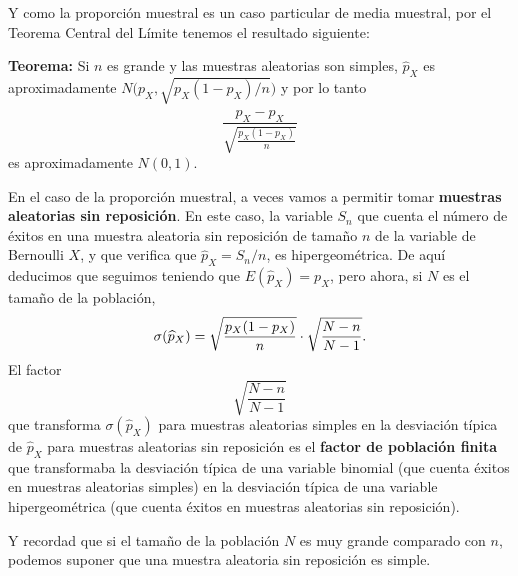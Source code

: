 \documentclass[
  spanish,
  letterpaper,
  DIV=11,
  numbers=noendperiod]{scrreprt}
\begin{document}
Y como la proporción muestral es un caso particular de media muestral,
por el Teorema Central del Límite tenemos el resultado siguiente:

\textbf{Teorema:} Si \(n\) es grande y las muestras aleatorias son
simples, \(\widehat{p}_X\) es aproximadamente
\(N\big (p_X,\sqrt{{p_X(1-p_X)}/{n}}\big)\) y por lo tanto \[
\frac{\widehat{p}_X-p_X}{\sqrt{\frac{{p}_X(1-{p}_X)}{n}}}
\] es aproximadamente \(N(0,1)\).

\begin{tcolorbox}[enhanced jigsaw, arc=.35mm, bottomrule=.15mm, bottomtitle=1mm, breakable, colback=white, colbacktitle=quarto-callout-important-color!10!white, colframe=quarto-callout-important-color-frame, coltitle=black, left=2mm, leftrule=.75mm, opacityback=0, opacitybacktitle=0.6, rightrule=.15mm, title=\textcolor{quarto-callout-important-color}{\faExclamation}\hspace{0.5em}{Importante}, titlerule=0mm, toprule=.15mm, toptitle=1mm]

En el caso de la proporción muestral, a veces vamos a permitir tomar
\textbf{muestras aleatorias sin reposición}. En este caso, la variable
\(S_n\) que cuenta el número de éxitos en una muestra aleatoria sin
reposición de tamaño \(n\) de la variable de Bernoulli \(X\), y que
verifica que \(\widehat{p}_X=S_n/n\), es hipergeométrica. De aquí
deducimos que seguimos teniendo que \(E(\widehat{p}_X)=p_X\), pero
ahora, si \(N\) es el tamaño de la población, \[
\sigma({\widehat{p}_X})=\sqrt{\frac{p_X(1-p_X)}{n}}\cdot
\sqrt{\frac{\vphantom{(p_X}N-n}{N-1}}.
\] El factor \[
\sqrt{\frac{N-n}{N-1}}
\] que transforma \(\sigma({\widehat{p}_X})\) para muestras aleatorias
simples en la desviación típica de \({\widehat{p}_X}\) para muestras
aleatorias sin reposición es el \textbf{factor de población finita} que
transformaba la desviación típica de una variable binomial (que cuenta
éxitos en muestras aleatorias simples) en la desviación típica de una
variable hipergeométrica (que cuenta éxitos en muestras aleatorias sin
reposición).

\end{tcolorbox}

\begin{tcolorbox}[enhanced jigsaw, arc=.35mm, bottomrule=.15mm, bottomtitle=1mm, breakable, colback=white, colbacktitle=quarto-callout-tip-color!10!white, colframe=quarto-callout-tip-color-frame, coltitle=black, left=2mm, leftrule=.75mm, opacityback=0, opacitybacktitle=0.6, rightrule=.15mm, title=\textcolor{quarto-callout-tip-color}{\faLightbulb}\hspace{0.5em}{Tip}, titlerule=0mm, toprule=.15mm, toptitle=1mm]

Y recordad que si el tamaño de la población \(N\) es muy grande
comparado con \(n\), podemos suponer que una muestra aleatoria sin
reposición es simple.

\end{tcolorbox}
\end{document}
